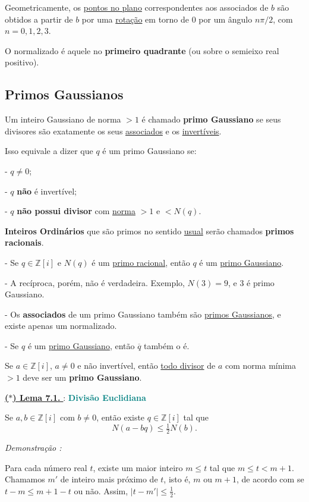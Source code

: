 Geometricamente, os \underline{pontos no plano} correspondentes aos associados de $b$ são obtidos 
a partir de $b$ por uma \underline{rotação} em torno de $0$ por um ângulo $n\pi/2$, com $n = 0,1,2,3$. 

O normalizado é aquele no \textbf{primeiro quadrante} (ou sobre o semieixo real positivo).  

\subsection*{Primos Gaussianos}

Um inteiro Gaussiano de norma $> 1$ é chamado \textbf{primo Gaussiano} se seus divisores são 
exatamente os seus \underline{associados} e os \underline{invertíveis}.  

\noindent Isso equivale a dizer que $q$ é um primo Gaussiano se:

- $q \neq 0$;

- $q$ \textbf{não} é invertível;

- $q$ \textbf{não possui divisor} com \underline{norma} $>1$ e $< N(q)$.

\noindent \textbf{Inteiros Ordinários} que são primos no sentido \underline{usual} serão chamados \textbf{primos racionais}.  

- Se $q \in \mathbb{Z}[i]$ e $N(q)$ é um \underline{primo racional}, então $q$ é um \underline{primo Gaussiano}.  

- A recíproca, porém, não é verdadeira. Exemplo, $N(3) = 9$, e $3$ é primo Gaussiano.  

- Os \textbf{associados} de um primo Gaussiano também são \underline{primos Gaussianos}, e existe apenas um normalizado.  

- Se $q$ é um \underline{primo Gaussiano}, então $\overline{q}$ também o é.  

Se $a \in \mathbb{Z}[i]$, $a \neq 0$ e não invertível, então \underline{todo divisor} de $a$ com norma mínima $> 1$ deve ser um \textbf{primo Gaussiano}.  

\vspace{0.3cm}
\noindent\underline{\underline{\textbf{($\ast$) Lema 7.1. }}} : \textbf{\textcolor{teal}{Divisão Euclidiana}}

Se $a, b \in \mathbb{Z}[i]$ com $b \neq 0$, então existe $q \in \mathbb{Z}[i]$ tal que
\[
N(a - bq) \leq \tfrac{1}{2}N(b).
\]

\noindent\textit{Demonstração : }

Para cada número real $t$, existe um maior inteiro $m \leq t$ tal que $m \leq t < m+1$.  
Chamamos $m'$ de inteiro mais próximo de $t$, isto é, $m$ ou $m+1$, de acordo com se $t-m \leq m+1-t$ ou não.  
Assim, $|t - m'| \leq \tfrac{1}{2}$.  

